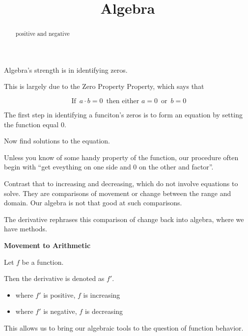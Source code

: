 \documentclass{ximera}
\title{Algebra}
\begin{document}
\begin{abstract}
positive and negative
\end{abstract}
\maketitle



Algebra's strength is in identifying zeros. 


This is largely due to the Zero Property Property, which says that 



\[
\text{ If } \, a \cdot b = 0 \, \text{ then either } a = 0 \, \text{ or } \, b = 0
\]


The first step in identifying a funciton's zeros is to form an equation by setting the function equal $0$.

Now find solutions to the equation. 


Unless you know of some handy property of the function, our procedure often begin with ``get eveything on one side and $0$ on the other and factor''.




Contrast that to increasing and decreasing, which do not involve equations to solve.  They are comparisons of movement or change between the range and domain. Our algebra is not that good at such comparisons. 


The derivative rephrases this comparison of change back into algebra, where we have methods. 





\begin{idea} \textbf{\textcolor{blue!55!black}{Movement to Arithmetic}} 

Let $f$ be a function. 

Then the derivative is denoted as $f'$. 

\begin{itemize}
\item where $f'$ is positive, $f$ is increasing  
\item where $f'$ is negative, $f$ is decreasing   
\end{itemize}

\end{idea}

This allows us to bring our algebraic tools to the question of function behavior. 
\end{document}
